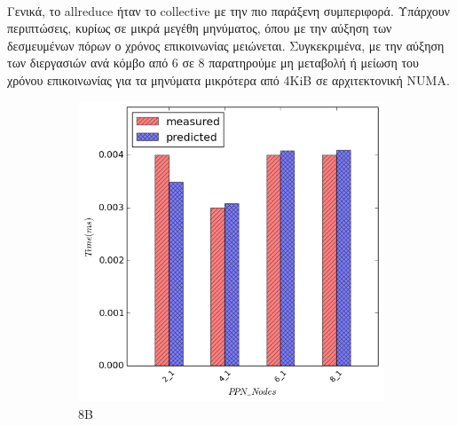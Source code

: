 \paragraph{}
Γενικά, το allreduce ήταν το collective με την πιο παράξενη συμπεριφορά. Υπάρχουν περιπτώσεις, κυρίως σε μικρά μεγέθη μηνύματος, όπου με την αύξηση των δεσμευμένων πόρων ο χρόνος επικοινωνίας μειώνεται. Συγκεκριμένα, με την αύξηση των διεργασιών ανά κόμβο από 6 σε 8 παρατηρούμε μη μεταβολή ή μείωση του χρόνου επικοινωνίας για τα μηνύματα μικρότερα από 4KiB σε αρχιτεκτονική NUMA. 


\begin{figure}[ht]
    \centering
    \captionsetup{justification=centering,margin=0cm,font=footnotesize}
    \begin{subfigure}[b]{0.4\textwidth}
        \includegraphics[width=\textwidth]{./images/allreduce/allreduce_8.png}
        \caption{8B}
    \end{subfigure}
    \quad 
        \begin{subfigure}[b]{0.4\textwidth}

\end{subfigure}
\end{figure}
